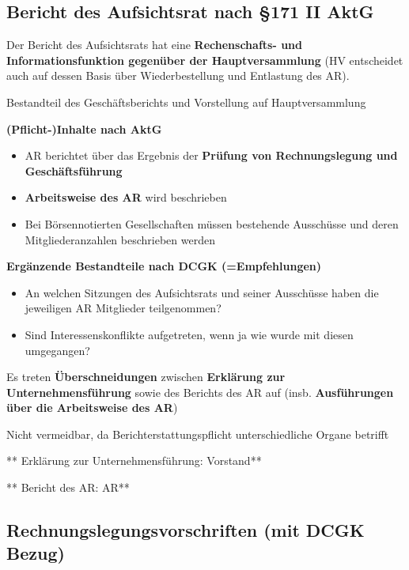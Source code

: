 \documentclass[
]{article}
\providecommand{\tightlist}{%
  \setlength{\itemsep}{0pt}\setlength{\parskip}{0pt}}
\begin{document}
\hypertarget{bericht-des-aufsichtsrat-nach-171-ii-aktg}{%
\subsection{Bericht des Aufsichtsrat nach §171 II
AktG}\label{bericht-des-aufsichtsrat-nach-171-ii-aktg}}

Der Bericht des Aufsichtsrats hat eine \textbf{Rechenschafts- und
Informationsfunktion gegenüber der Hauptversammlung }(HV entscheidet
auch auf dessen Basis über Wiederbestellung und Entlastung des AR).

Bestandteil des Geschäftsberichts und Vorstellung auf Hauptversammlung

\textbf{(Pflicht-)Inhalte nach AktG}

\begin{itemize}
\tightlist
\item
  AR berichtet über das Ergebnis der \textbf{Prüfung von Rechnungslegung
  und Geschäftsführung}
\item
  \textbf{Arbeitsweise des AR} wird beschrieben
\item
  Bei Börsennotierten Gesellschaften müssen bestehende Ausschüsse und
  deren Mitgliederanzahlen beschrieben werden
\end{itemize}

\textbf{Ergänzende Bestandteile nach DCGK (=Empfehlungen)}

\begin{itemize}
\tightlist
\item
  An welchen Sitzungen des Aufsichtsrats und seiner Ausschüsse haben die
  jeweiligen AR Mitglieder teilgenommen?
\item
  Sind Interessenskonflikte aufgetreten, wenn ja wie wurde mit diesen
  umgegangen?
\end{itemize}

Es treten \textbf{Überschneidungen} zwischen \textbf{Erklärung zur
Unternehmensführung} sowie des Berichts des AR auf (insb.
\textbf{Ausführungen über die Arbeitsweise des AR})

Nicht vermeidbar, da Berichterstattungspflicht unterschiedliche Organe
betrifft

** Erklärung zur Unternehmensführung: Vorstand**

** Bericht des AR: AR**

\hypertarget{rechnungslegungsvorschriften-mit-dcgk-bezug}{%
\subsection{Rechnungslegungsvorschriften (mit DCGK
Bezug)}\label{rechnungslegungsvorschriften-mit-dcgk-bezug}}
\end{document}
